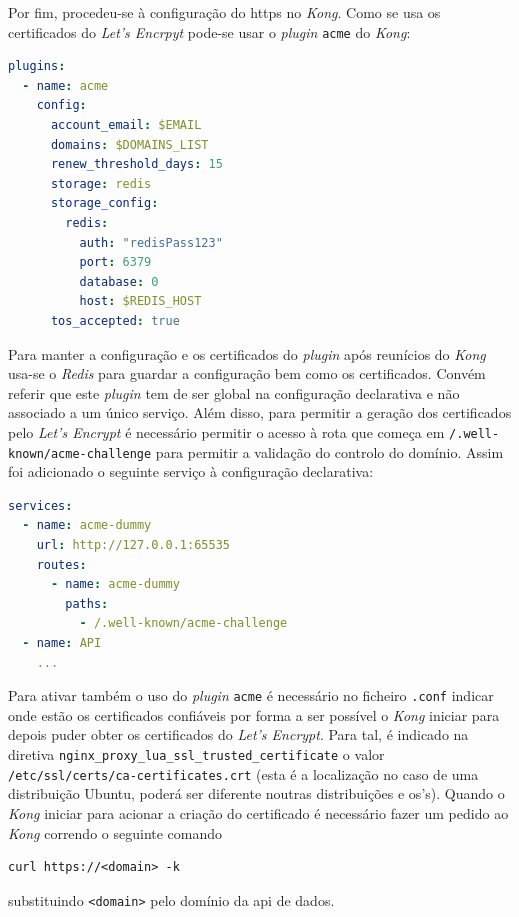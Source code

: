 Por fim, procedeu-se à configuração do \acrshort{https} no \textit{Kong}. Como se usa os certificados do \textit{Let's Encrpyt} pode-se usar o \textit{plugin} \texttt{acme} do \textit{Kong}\cite{kongACME}:
\begin{lstlisting}[language=yaml, caption=Configuração declarativa do \textit{Kong}: \textit{plugin} \texttt{acme}]
plugins:
  - name: acme
    config:
      account_email: $EMAIL
      domains: $DOMAINS_LIST
      renew_threshold_days: 15
      storage: redis
      storage_config:
        redis:
          auth: "redisPass123"
          port: 6379
          database: 0
          host: $REDIS_HOST
      tos_accepted: true
\end{lstlisting}
Para manter a configuração e os certificados do \textit{plugin} após reunícios do \textit{Kong} usa-se o \textit{Redis} para guardar a configuração bem como os certificados. Convém referir que este \textit{plugin} tem de ser global na configuração declarativa e não associado a um único serviço. Além disso, para permitir a geração dos certificados pelo \textit{Let's Encrypt} é necessário permitir o acesso à rota que começa em \texttt{/.well-known/acme-challenge} para permitir a validação do controlo do domínio. Assim foi adicionado o seguinte serviço à configuração declarativa:
\begin{lstlisting}[language=yaml, caption=Configuração declarativa do \textit{Kong}: Serviço para a geração de certificados \acrshort{tls}]
services:
  - name: acme-dummy
    url: http://127.0.0.1:65535
    routes:
      - name: acme-dummy
        paths:
          - /.well-known/acme-challenge
  - name: API
    ...
\end{lstlisting}
Para ativar também o uso do \textit{plugin} \texttt{acme} é necessário no ficheiro \texttt{.conf} indicar onde estão os certificados confiáveis por forma a ser possível o \textit{Kong} iniciar para depois puder obter os certificados do \textit{Let's Encrypt}. Para tal, é indicado na diretiva \texttt{nginx\_proxy\_lua\_ssl\_trusted\_certificate} o valor \texttt{/etc/ssl/certs/ca-certificates.crt} (esta é a localização no caso de uma distribuição Ubuntu, poderá ser diferente noutras distribuições e \acrshort{os}'s). Quando o \textit{Kong} iniciar para acionar a criação do certificado é necessário fazer um pedido ao \textit{Kong} correndo o seguinte comando
\begin{verbatim}
curl https://<domain> -k
\end{verbatim}
substituindo \verb|<domain>| pelo domínio da \acrshort{api} de dados.

